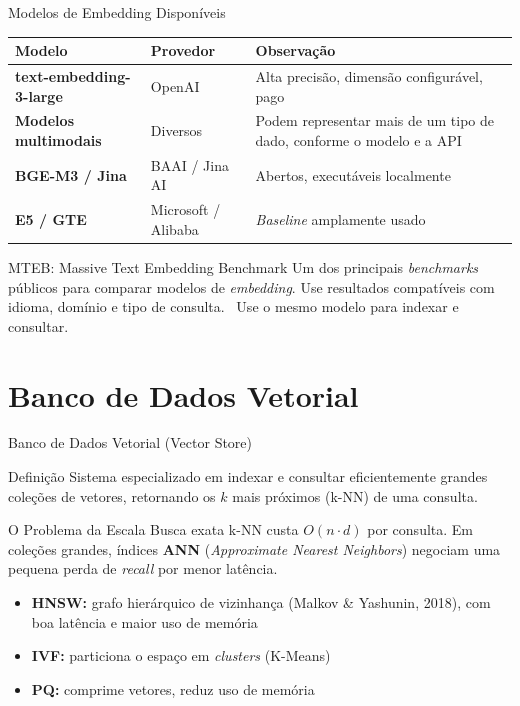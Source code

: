 \documentclass[aspectratio=169]{beamer}
\begin{document}
\begin{frame}{Modelos de Embedding Disponíveis}
    \begin{center}\footnotesize
    \begin{tabular}{>{\bfseries}p{3.0cm}p{2.6cm}p{5.2cm}}
    \toprule
    Modelo & Provedor & Observação \\
    \midrule
    text-embedding-3-large & OpenAI & Alta precisão, dimensão configurável, pago \\
    Modelos multimodais & Diversos & Podem representar mais de um tipo de dado, conforme o modelo e a API \\
    BGE-M3 / Jina & BAAI / Jina AI & Abertos, executáveis localmente \\
    E5 / GTE & Microsoft / Alibaba & \textit{Baseline} amplamente usado \\
    \bottomrule
    \end{tabular}
    \end{center}
    \pause
    \begin{alertblock}{MTEB: Massive Text Embedding Benchmark}
        \footnotesize Um dos principais \textit{benchmarks} públicos para comparar modelos de \textit{embedding}. Use resultados compatíveis com idioma, domínio e tipo de consulta. \ Use o mesmo modelo para indexar e consultar.
    \end{alertblock}
\end{frame}

\section{Banco de Dados Vetorial}

\begin{frame}{Banco de Dados Vetorial (Vector Store)}
    \begin{block}{Definição}
        \footnotesize Sistema especializado em indexar e consultar eficientemente grandes coleções de vetores, retornando os $k$ mais próximos (k-NN) de uma consulta.
    \end{block}
    \pause
    \begin{alertblock}{O Problema da Escala}
        \footnotesize Busca exata k-NN custa $O(n \cdot d)$ por consulta. Em coleções grandes, índices \textbf{ANN} (\textit{Approximate Nearest Neighbors}) negociam uma pequena perda de \textit{recall} por menor latência.
    \end{alertblock}
    \pause
    \begin{itemize}\footnotesize
        \item \textbf{HNSW:} grafo hierárquico de vizinhança (Malkov \& Yashunin, 2018), com boa latência e maior uso de memória
        \item \textbf{IVF:} particiona o espaço em \textit{clusters} (K-Means)
        \item \textbf{PQ:} comprime vetores, reduz uso de memória
    \end{itemize}
\end{frame}
\end{document}

